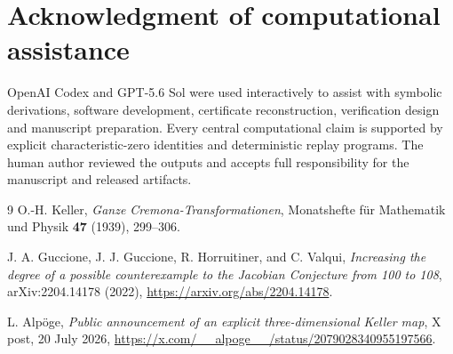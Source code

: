 \documentclass[11pt,a4paper]{article}
\theoremstyle{remark}
\begin{document}
\section*{Acknowledgment of computational assistance}
OpenAI Codex and GPT-5.6 Sol were used interactively to assist with symbolic derivations, software development, certificate reconstruction, verification design and manuscript preparation. Every central computational claim is supported by explicit characteristic-zero identities and deterministic replay programs. The human author reviewed the outputs and accepts full responsibility for the manuscript and released artifacts.

\begin{thebibliography}{9}
O.-H. Keller,
\emph{Ganze Cremona-Transformationen},
Monatshefte f\"ur Mathematik und Physik \textbf{47} (1939), 299--306.

J. A. Guccione, J. J. Guccione, R. Horruitiner, and C. Valqui,
\emph{Increasing the degree of a possible counterexample to the Jacobian Conjecture from 100 to 108},
arXiv:2204.14178 (2022),
\url{https://arxiv.org/abs/2204.14178}.

L. Alp\"oge,
\emph{Public announcement of an explicit three-dimensional Keller map},
X post, 20 July 2026,
\url{https://x.com/__alpoge__/status/2079028340955197566}.

\end{thebibliography}
\end{document}
